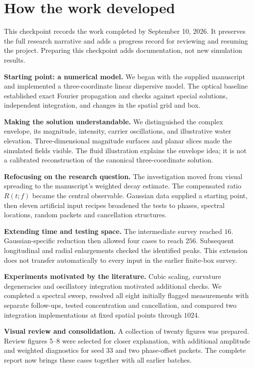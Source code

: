 \documentclass[10pt,letterpaper]{article}
\begin{document}
\section*{How the work developed}
This checkpoint records the work completed by September 10, 2026. It preserves the
full research narrative and adds a progress record for reviewing and resuming the
project. Preparing this checkpoint adds documentation, not new simulation results.

\textbf{Starting point: a numerical model.} We began with the supplied manuscript
and implemented a three-coordinate linear dispersive model. The optical baseline
established exact Fourier propagation and checks against special solutions,
independent integration, and changes in the spatial grid and box.

\textbf{Making the solution understandable.} We distinguished the complex envelope,
its magnitude, intensity, carrier oscillations, and illustrative water elevation.
Three-dimensional magnitude surfaces and planar slices made the simulated fields
visible. The fluid illustration explains the envelope idea; it is not a calibrated
reconstruction of the canonical three-coordinate solution.

\textbf{Refocusing on the research question.} The investigation moved from visual
spreading to the manuscript's weighted decay estimate. The compensated ratio
$R(t;f)$ became the central observable. Gaussian data supplied a starting point,
then eleven artificial input recipes broadened the tests to phases, spectral
locations, random packets and cancellation structures.

\textbf{Extending time and testing space.} The intermediate survey reached $16$.
Gaussian-specific reduction then allowed four cases to reach $256$. Subsequent
longitudinal and radial enlargements checked the identified peaks. This extension
does not transfer automatically to every input in the earlier finite-box survey.

\textbf{Experiments motivated by the literature.} Cubic scaling, curvature
degeneracies and oscillatory integration motivated additional checks. We completed
a spectral sweep, resolved all eight initially flagged measurements with separate
follow-ups, tested concentration and cancellation, and compared two integration
implementations at fixed spatial points through $1024$.

\textbf{Visual review and consolidation.} A collection of twenty figures was
prepared. Review figures 5--8 were selected for closer explanation, with additional
amplitude and weighted diagnostics for seed 33 and two phase-offset packets.
The complete report now brings these cases together with all earlier batches.
\end{document}
